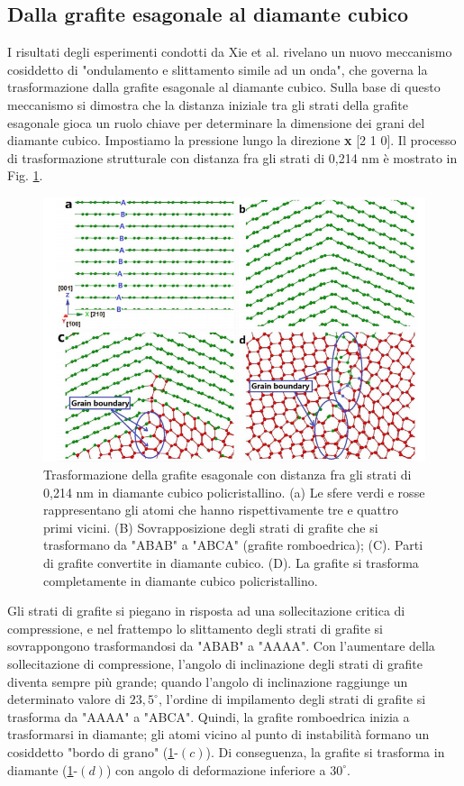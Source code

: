 \documentclass[a4paper,titlepage]{book}
\begin{document}
\subsection{Dalla grafite esagonale al diamante cubico}
I risultati degli esperimenti condotti da Xie et al. \cite{XIE} rivelano un nuovo meccanismo cosiddetto di "ondulamento e slittamento simile ad un onda", che governa la trasformazione dalla grafite esagonale al diamante cubico. Sulla base di questo meccanismo si dimostra che la distanza iniziale tra gli strati della grafite esagonale gioca un ruolo chiave per determinare la dimensione dei grani del diamante cubico. 
Impostiamo la pressione lungo la direzione \textbf{x} [2 1 0]. Il processo di trasformazione strutturale con distanza fra gli strati di 0,214 nm è mostrato in Fig. \ref{diamon}.\\
 \begin{figure}[h!] 
	\centering
	\includegraphics[width=0.8\columnwidth]{graphtodiamond.png}
	\caption{ 	\label{diamon}
		Trasformazione della grafite esagonale con distanza fra gli strati di 0,214 nm in diamante cubico policristallino. (a) Le sfere verdi e rosse rappresentano gli atomi che hanno rispettivamente tre e quattro primi vicini. (B) Sovrapposizione degli strati di grafite che si trasformano da "ABAB" a "ABCA" (grafite romboedrica); (C). Parti di grafite convertite in diamante cubico. (D). La grafite si trasforma completamente in diamante cubico policristallino. 
	}
\end{figure}
Gli strati di grafite si piegano in risposta ad una sollecitazione critica di compressione, e nel frattempo lo slittamento degli strati di grafite si sovrappongono trasformandosi da "ABAB" a "AAAA". Con l'aumentare della sollecitazione di compressione, l'angolo di inclinazione degli strati di grafite diventa sempre più grande; quando l'angolo di inclinazione raggiunge un determinato valore di $23,5^\circ$, l'ordine di impilamento degli strati di grafite si trasforma da "AAAA" a "ABCA". Quindi, la grafite romboedrica inizia a trasformarsi in diamante; gli atomi vicino al punto di instabilità formano un cosiddetto "bordo di grano" (\ref{diamon}-$(c)$). Di conseguenza, la grafite si trasforma in diamante (\ref{diamon}-$(d)$) con angolo di deformazione inferiore a $30^\circ$.
\end{document}
